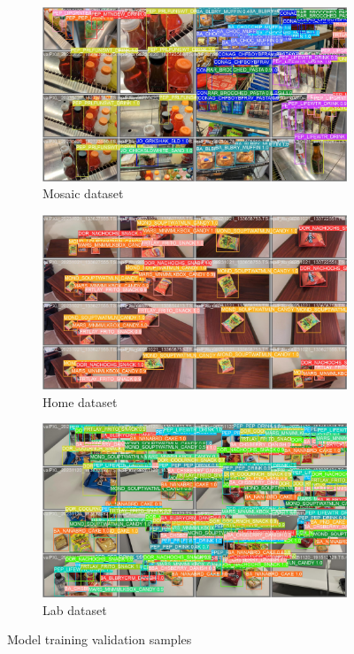 \documentclass[thesis]{fputhesis}
\begin{document}
\begin{body}
\begin{figure}[h!]
    \centering
    \begin{subfigure}[]{.65\textwidth}
        \includegraphics[width=\textwidth]{Images/mosaic-val.jpg}
        \caption{Mosaic dataset}
        \label{fig:mosaic-val}
    \end{subfigure}
    \begin{subfigure}[]{.65\textwidth}
        \includegraphics[width=\textwidth]{Images/roomset-val.jpg}
        \caption{Home dataset}
        \label{fig:roomset-val}
    \end{subfigure}
    \begin{subfigure}[]{.65\textwidth}
        \includegraphics[width=\textwidth]{Images/labset-val.jpg}
        \caption{Lab dataset}
        \label{fig:labset-val}
    \end{subfigure}
    \caption{Model training validation samples}
    \label{fig:model-val}
\end{figure}

\end{body}
\end{document}
